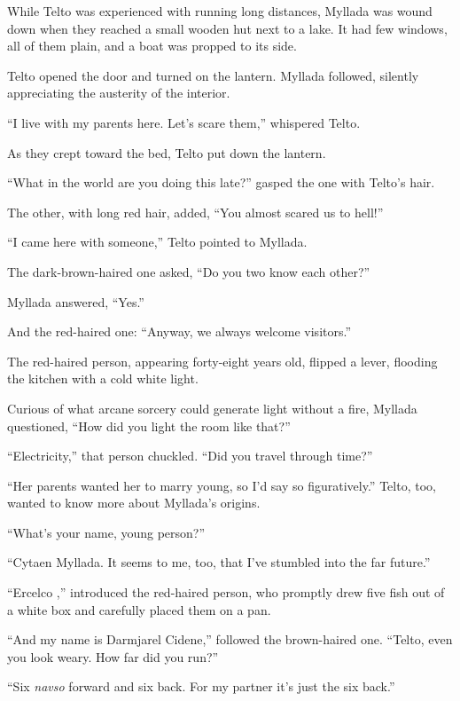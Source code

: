 \centeredstars

While Telto was experienced with running long distances, Myllada was wound down when they reached a small wooden hut next to a lake. It had few windows, all of them plain, and a boat was propped to its side.

Telto opened the door and turned on the lantern. Myllada followed, silently appreciating the austerity of the interior.

``I live with my parents here. Let's scare them,'' whispered Telto.

As they crept toward the bed, Telto put down the lantern.

\centeredstars

``What in the world are you doing this late?'' gasped the one with Telto's hair.

The other, with long red hair, added, ``You almost scared us to hell!''

``I came here with someone,'' Telto pointed to Myllada.

The dark-brown-haired one asked, ``Do you two know each other?''

Myllada answered, ``Yes.''

And the red-haired one: ``Anyway, we always welcome visitors.''

The red-haired person, appearing forty-eight years old, flipped a lever, flooding the kitchen with a cold white light.

Curious of what arcane sorcery could generate light without a fire, Myllada questioned, ``How did you light the room like that?''

``Electricity,'' that person chuckled. ``Did you travel through time?''

``Her parents wanted her to marry young, so I'd say so figuratively.'' Telto, too, wanted to know more about Myllada's origins.

``What's your name, young person?''

``Cytaen Myllada. It seems to me, too, that I've stumbled into the far future.''

``Ercelco \sypros,'' introduced the red-haired person, who promptly drew five fish out of a white box and carefully placed them on a pan.

``And my name is Darmjarel Cidene,'' followed the brown-haired one. ``Telto, even you look weary. How far did you run?''

``Six \emph{navso} forward and six back. For my partner it's just the six back.''

